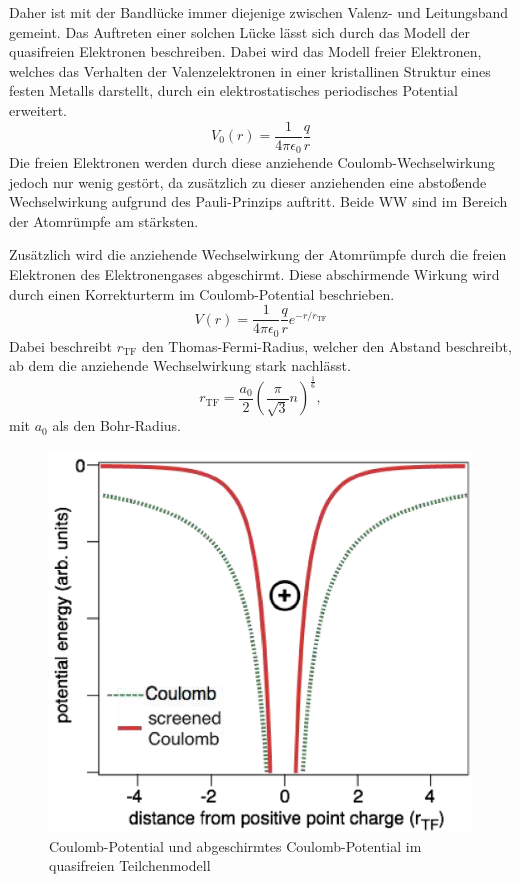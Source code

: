 Daher ist mit der Bandlücke immer diejenige zwischen Valenz- und Leitungsband gemeint.
Das Auftreten einer solchen Lücke lässt sich durch das Modell der quasifreien Elektronen beschreiben. Dabei wird das Modell freier Elektronen, welches das Verhalten der Valenzelektronen in einer kristallinen Struktur eines festen Metalls darstellt, durch ein elektrostatisches periodisches Potential
erweitert.
\begin{equation}
    \label{eq:coulomb_potential}
    V_0(r) = \frac{1}{4\pi\epsilon_0}\frac{q}{r}
\end{equation}
Die freien Elektronen werden durch diese anziehende Coulomb-Wechselwirkung jedoch nur wenig gestört, da zusätzlich zu dieser anziehenden eine abstoßende Wechselwirkung aufgrund des Pauli-Prinzips auftritt. Beide WW sind im Bereich der Atomrümpfe am stärksten.

Zusätzlich wird die anziehende Wechselwirkung der Atomrümpfe durch die freien Elektronen des Elektronengases abgeschirmt. Diese abschirmende Wirkung wird durch einen Korrekturterm im Coulomb-Potential beschrieben.
\begin{equation}
    \label{eq:}
    V(r) = \frac{1}{4\pi\epsilon_0}\frac{q}{r}e^{-r/r_{\text{TF}}}
\end{equation}
Dabei beschreibt $r_{\text{TF}}$ den Thomas-Fermi-Radius, welcher den Abstand beschreibt, ab dem die anziehende Wechselwirkung stark nachlässt.
\begin{equation}
    \label{eq:Thomas-Fermi-Radius}
    r_{\text{TF}} = \frac{a_0}{2}\left(\frac{\pi}{\sqrt{3}}n\right)^{\frac{1}{6}},
\end{equation}
mit $a_0$ als den Bohr-Radius.

\begin{figure}[H]
    \centering
    \begin{samepage}
        \includegraphics[width=0.6\linewidth]{resources/05-01-2015/coulomb_potential_screened.png}
        \caption{Coulomb-Potential und abgeschirmtes Coulomb-Potential im quasifreien Teilchenmodell}
        \label{fig:coulomb_potential_with_and_without_screening}
    \end{samepage}
\end{figure}

